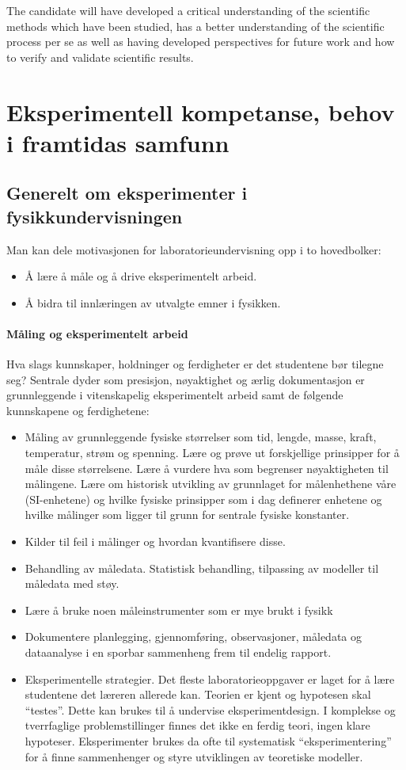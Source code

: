 \documentclass{article}
\begin{document}
\noindent
The candidate will have developed a critical understanding of the scientific methods which have been studied, has a better understanding of the scientific process per se as well as having developed perspectives for future work and how to verify and validate scientific results.



\section{Eksperimentell kompetanse, behov i framtidas samfunn}
\subsection{Generelt om eksperimenter i fysikkundervisningen}
Man kan dele motivasjonen for laboratorieundervisning opp i to hovedbolker:
\begin{itemize}
    \item Å lære å måle og å drive eksperimentelt arbeid.
    \item Å bidra til innlæringen av utvalgte emner i
    fysikken.
\end{itemize}
\paragraph{Måling og eksperimentelt arbeid}
Hva slags kunnskaper, holdninger og ferdigheter er det studentene bør tilegne seg? Sentrale dyder som presisjon, nøyaktighet og ærlig dokumentasjon er grunnleggende i vitenskapelig eksperimentelt arbeid samt de følgende kunnskapene og ferdighetene:
\begin{itemize}
    \item Måling av grunnleggende fysiske størrelser som tid, lengde, masse, kraft, temperatur, strøm og spenning. Lære og prøve ut forskjellige prinsipper for å måle disse størrelsene. Lære å vurdere hva som begrenser nøyaktigheten til målingene. Lære om historisk utvikling av grunnlaget for målenhethene våre (SI-enhetene) og hvilke fysiske prinsipper som i dag definerer enhetene og hvilke målinger som ligger til grunn for sentrale fysiske konstanter.
    \item Kilder til feil i målinger og hvordan kvantifisere disse.
    \item Behandling av måledata. Statistisk behandling, tilpassing av modeller til måledata med støy.
    \item Lære å bruke noen måleinstrumenter som er mye brukt i fysikk
    \item Dokumentere planlegging, gjennomføring, observasjoner, måledata og dataanalyse i en sporbar sammenheng frem til endelig rapport.
    \item Eksperimentelle strategier. Det fleste laboratorieoppgaver er laget for å lære studentene det læreren allerede kan. Teorien er kjent og hypotesen skal ``testes''. Dette kan brukes til å undervise eksperimentdesign. I komplekse og tverrfaglige problemstillinger finnes det ikke en ferdig teori, ingen klare hypoteser. Eksperimenter brukes da ofte til systematisk ``eksperimentering'' for å finne sammenhenger og styre utviklingen av teoretiske modeller. 
\end{itemize}
\end{document}
